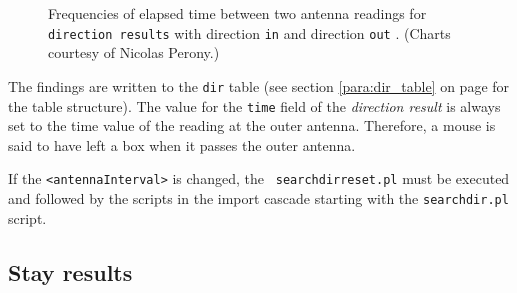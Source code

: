 \begin{figure}[htpb]%
\centering 
{}%
\qquad 
{} 
\caption[Frequencies of elapsed time between antenna readings of direction results]{Frequencies of elapsed time between two antenna readings for \lstinline|direction results| with direction \lstinline|in|  and direction \lstinline|out| . \footnotesize(Charts courtesy of Nicolas Perony.)}
\label{fig:dist_dir_elapse} 

\end{figure}

The findings are written to the \lstinline|dir| table (see section \ref{para:dir_table} on page \pageref{para:dir_table} for the table structure). The value for the \lstinline|time| field of the \textit{direction result} is always set to the time value of the reading at the outer antenna. Therefore, a mouse is said to have left a box when it passes the outer antenna.

If the \lstinline|<antennaInterval>| is changed, the \lstinline| searchdirreset.pl| must be executed and followed by the scripts in the import cascade starting with the \lstinline|searchdir.pl| script. 

\subsection{Stay results}
\label{subsec:stayres}

